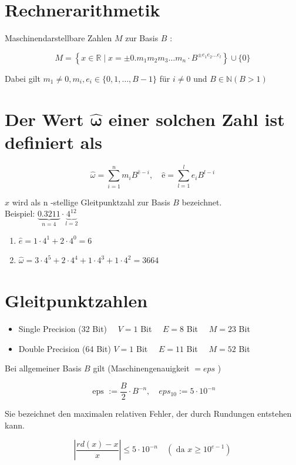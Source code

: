 \documentclass[10pt]{article}
\begin{document}
\section*{Rechnerarithmetik}
Maschinendarstellbare Zahlen $M$ zur Basis $B$ :

$$
M=\left\{x \in \mathbb{R} \mid x= \pm 0 . m_{1} m_{2} m_{3} \ldots m_{n} \cdot B^{ \pm e_{1} e_{2} \ldots e_{l}}\right\} \cup\{0\}
$$

Dabei gilt $m_{1} \neq 0, m_{i}, e_{i} \in\{0,1, \ldots, B-1\}$ für $i \neq 0$ und $B \in \mathbb{N}(B>1)$

\section*{Der Wert $\widehat{\boldsymbol{\omega}}$ einer solchen Zahl ist definiert als}
$$
\widehat{\omega}=\sum_{i=1}^{n} m_{i} B^{\hat{\mathrm{e}}-i}, \quad \hat{\mathrm{e}}=\sum_{l=1}^{l} e_{i} B^{l-i}
$$

$x$ wird als n -stellige Gleitpunktzahl zur Basis $B$ bezeichnet.\\
Beispiel: $\underbrace{0.3211}_{n=4} \cdot \underbrace{4^{12}}_{l=2}$

\begin{enumerate}
  \item $\hat{e}=1 \cdot 4^{1}+2 \cdot 4^{0}=6$
  \item $\widehat{\omega}=3 \cdot 4^{5}+2 \cdot 4^{4}+1 \cdot 4^{3}+1 \cdot 4^{2}=3664$
\end{enumerate}

\section*{Gleitpunktzahlen}
\begin{itemize}
  \item Single Precision (32 Bit) $\quad V=1$ Bit $\quad E=8$ Bit $\quad M=23$ Bit
  \item Double Precision (64 Bit) $V=1$ Bit $\quad E=11$ Bit $\quad M=52$ Bit
\end{itemize}

Bei allgemeiner Basis $B$ gilt (Maschinengenauigkeit $=e p s$ )

$$
\text { eps }:=\frac{B}{2} \cdot B^{-n}, \quad e p s_{10}:=5 \cdot 10^{-n}
$$

Sie bezeichnet den maximalen relativen Fehler, der durch Rundungen entstehen kann.

$$
\left|\frac{r d(x)-x}{x}\right| \leq 5 \cdot 10^{-n} \quad\left(\text { da } x \geq 10^{e-1}\right)
$$
\end{document}
